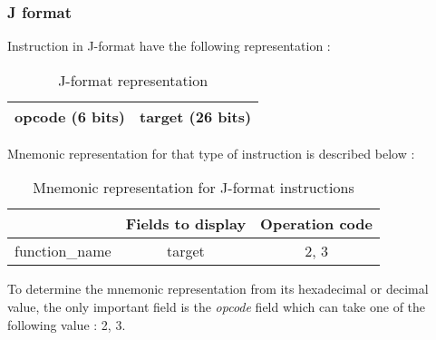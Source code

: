 \subsubsection*{J format}

	Instruction in J-format have the following representation :
	
	\begin{table}[H]
		\centering
		\begin{tabular}{|c|c|}
			\hline
			opcode (6 bits) & target (26 bits)\\
			\hline
		\end{tabular}
		\caption{J-format representation}
	\end{table}
	
	Mnemonic representation for that type of instruction is described below :
	\begin{table}[H]
		\centering
		\begin{tabular}{|c|c|c|}
			\hline
			& \textbf{Fields to display} & \textbf{Operation code}\\
			\hline
			function\_name & target  & 2, 3\\
			\hline
		\end{tabular}
		\caption{Mnemonic representation for J-format instructions}
	\end{table}
	
	To determine the mnemonic representation from its hexadecimal or decimal value, the only important field is the \textit{opcode} field which can take one of the following value : 2, 3.